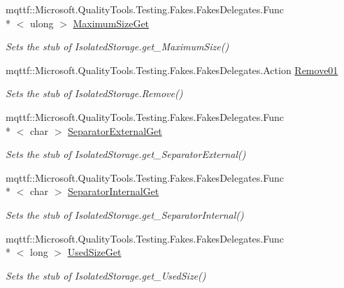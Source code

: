 \begin{DoxyCompactItemize}
mqttf\-::\-Microsoft.\-Quality\-Tools.\-Testing.\-Fakes.\-Fakes\-Delegates.\-Func\\*
$<$ ulong $>$ \hyperlink{class_system_1_1_i_o_1_1_isolated_storage_1_1_fakes_1_1_stub_isolated_storage_af74e89f7b0e56485ad93d4853915df36}{Maximum\-Size\-Get}
\begin{DoxyCompactList}\small\item\em Sets the stub of Isolated\-Storage.\-get\-\_\-\-Maximum\-Size()\end{DoxyCompactList}\item 
mqttf\-::\-Microsoft.\-Quality\-Tools.\-Testing.\-Fakes.\-Fakes\-Delegates.\-Action \hyperlink{class_system_1_1_i_o_1_1_isolated_storage_1_1_fakes_1_1_stub_isolated_storage_ad1c670d2e74cb3a032ea854700d175b2}{Remove01}
\begin{DoxyCompactList}\small\item\em Sets the stub of Isolated\-Storage.\-Remove()\end{DoxyCompactList}\item 
mqttf\-::\-Microsoft.\-Quality\-Tools.\-Testing.\-Fakes.\-Fakes\-Delegates.\-Func\\*
$<$ char $>$ \hyperlink{class_system_1_1_i_o_1_1_isolated_storage_1_1_fakes_1_1_stub_isolated_storage_a8aedc87a6e7421cfc38dd89e40eaf01d}{Separator\-External\-Get}
\begin{DoxyCompactList}\small\item\em Sets the stub of Isolated\-Storage.\-get\-\_\-\-Separator\-External()\end{DoxyCompactList}\item 
mqttf\-::\-Microsoft.\-Quality\-Tools.\-Testing.\-Fakes.\-Fakes\-Delegates.\-Func\\*
$<$ char $>$ \hyperlink{class_system_1_1_i_o_1_1_isolated_storage_1_1_fakes_1_1_stub_isolated_storage_a87cbb540877f8ef44e7dc73eea09c259}{Separator\-Internal\-Get}
\begin{DoxyCompactList}\small\item\em Sets the stub of Isolated\-Storage.\-get\-\_\-\-Separator\-Internal()\end{DoxyCompactList}\item 
mqttf\-::\-Microsoft.\-Quality\-Tools.\-Testing.\-Fakes.\-Fakes\-Delegates.\-Func\\*
$<$ long $>$ \hyperlink{class_system_1_1_i_o_1_1_isolated_storage_1_1_fakes_1_1_stub_isolated_storage_ac7206f93f5a535b14740e71e59a47aae}{Used\-Size\-Get}
\begin{DoxyCompactList}\small\item\em Sets the stub of Isolated\-Storage.\-get\-\_\-\-Used\-Size()\end{DoxyCompactList}\end{DoxyCompactItemize}
